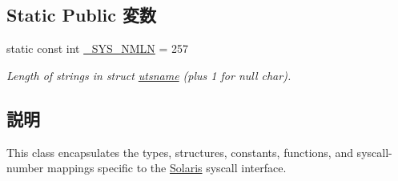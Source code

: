 \subsection*{Static Public 変数}
\begin{DoxyCompactItemize}
\item 
static const int \hyperlink{classSolaris_a1a19d4c9718c9a4ad5fa2e48271fccc9}{\_\-SYS\_\-NMLN} = 257
\begin{DoxyCompactList}\small\item\em Length of strings in struct \hyperlink{structSolaris_1_1utsname}{utsname} (plus 1 for null char). \item\end{DoxyCompactList}\end{DoxyCompactItemize}


\subsection{説明}
This class encapsulates the types, structures, constants, functions, and syscall-\/number mappings specific to the \hyperlink{classSolaris}{Solaris} syscall interface. 

